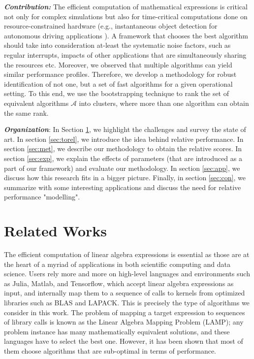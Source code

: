 \documentclass[conference]{IEEEtran}
\begin{document}
\textbf{\textit{Contribution:} }The efficient computation of mathematical expressions is critical not only for complex
simulations but also for time-critical computations done on resource-constrained hardware \cite{towardsEdgeComputing}
(e.g., instantaneous object detection for autonomous driving applications \cite{connectedvehicles}). A framework that
chooses the best algorithm should take into consideration at-least the systematic noise factors, such as  regular
interrupts, impacts of  other applications that are simultaneously sharing the resources etc. Moreover, we observed that
multiple algorithms can yield similar performance profiles. Therefore,  we develop a methodology for robust identification of not one, but a set of  fast algorithms for a given operational setting. To this end, we use the bootstrapping technique\cite{bootstrap} to rank the set of equivalent algorithms $\mathcal{A}$ into clusters, where more than one algorithm can obtain the same rank.

\textit{\textbf{Organization}}: In Section \ref{sec:rel}, we highlight the challenges and survey the state of art. In section \ref{sec:torel},  we introduce the idea behind relative performance. In section \ref{sec:met}, we describe our methodology to obtain the relative scores. In section \ref{sec:exp}, we explain the effects of parameters (that are introduced as a part of our framework) and evaluate our methodology. In section \ref{sec:app}, we discuss how this research fits in a bigger picture. Finally, in section \ref{sec:con}, we  summarize with some interesting applications and discuss the need for relative performance "modelling". 
  

\section{Related Works}
\label{sec:rel}

The efficient computation of linear algebra expressions is essential as those are at the heart of a myriad of
applications in both scientific computing and data science. Users rely more and more on high-level languages and
environments such as Julia\cite{julia}, Matlab\cite{MatlabOTB}, and Tensorflow\cite{tensorflow}, which accept linear
algebra expressions as input, and internally map them to a sequence of calls to kernels from optimized libraries such as
BLAS and LAPACK. This is precisely the type of algorithms we consider in this work. The problem of mapping a target
expression to sequences of library calls is known as the Linear Algebra Mapping Problem (LAMP)\cite{psarras2019linear};
any problem instance has many mathematically equivalent solutions, and these languages have to select the best
one. However, it has been shown that most of them choose algorithms that are sub-optimal in terms of performance\cite{psarras2019linear}.
\end{document}
